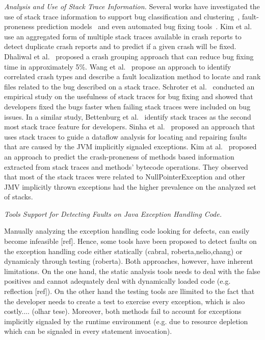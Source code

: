 \documentclass[conference]{IEEEtran}
\begin{document}
\textit{Analysis and Use of Stack Trace Information.} Several works have
investigated the use of stack trace information to support bug classification
and clustering~\cite{wang2013improving, kim2011crash, dhaliwal2011classifying},
fault-proneness prediction models~\cite{kim2013predicting} and even automated
bug fixing tools~\cite{sinha2009fault}. Kim et al.~\cite{kim2011crash} use an
aggregated form of multiple stack traces available in crash reports to detect
duplicate crash reports and to predict if a given crash will be fixed. Dhaliwal
et al.~\cite{dhaliwal2011classifying} proposed a crash grouping approach that
can reduce bug fixing time in approximately 5\%. Wang et
al.~\cite{wang2013improving} propose an approach to identify correlated crash
types and describe a fault localization method to locate and rank files related
to the bug described on a stack trace. Schroter et al.~\cite{schroter2010stack}
conducted an empirical study on the usefulness of stack traces for bug fixing
and showed that developers fixed the bugs faster when failing stack traces were
included on bug issues.  In a similar study, Bettenburg et
al.~\cite{bettenburg2008makes} identify stack traces as the second most stack
trace feature for developers.  Sinha et al.~\cite{sinha2009fault} proposed an
approach that uses stack traces to guide a dataflow analysis for locating and
repairing faults that are caused by the JVM implicitly signaled exceptions. Kim
at al.~\cite{kim2013predicting} proposed an approach to predict the
crash-proneness of methods based information extracted from stack traces and
methods' bytecode operations.  They observed that most of the stack traces were
related to NullPointerException and other JMV implicitly thrown exceptions had
the higher prevalence on the analyzed set of stacks.


\textit{Tools Support for Detecting Faults on Java Exception Handling Code.} 

Manually analyzing the exception handling code looking for defects, can easily 
become infeasible [ref]. Hence, some tools have been proposed to detect faults 
on the exception handling code either statically (cabral, roberta,nelio,chang) 
or dynamicaly through testing (roberta). Both approaches, however, have inherent
 limitations. On the one hand, the static analysis tools needs to deal with the false 
positives and cannot adequately deal with dynamically loaded code (e.g. reflection  
[ref]). On the other hand the testing tools are llimited to the fact that the developer
 needs to create a test to exercise every exception, which is also costly.... (olhar tese). 
Moreover, both methods fail to account for exceptions implicitly signaled by the runtime 
environment (e.g. due to resource depletion which can be signaled in every statement invocation). 
\end{document}
